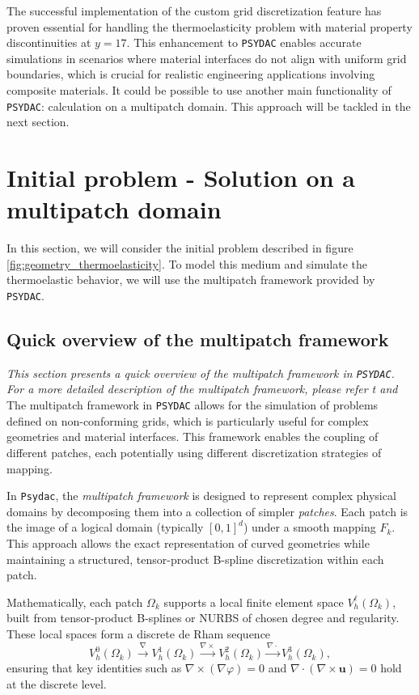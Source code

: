 \documentclass[a4paper,12pt,twoside]{report}
\begin{document}
The successful implementation of the custom grid discretization feature has proven essential for handling the thermoelasticity problem with material property discontinuities at $y = 17$. This enhancement to \texttt{PSYDAC} enables accurate simulations in scenarios where material interfaces do not align with uniform grid boundaries, which is crucial for realistic engineering applications involving composite materials. It could be possible to use another main functionality of \texttt{PSYDAC}: calculation on a multipatch domain. This approach will be tackled in the next section. 

\section{Initial problem - Solution on a multipatch domain}

In this section, we will consider the initial problem described in figure \ref{fig:geometry_thermoelasticity}. To model this medium and simulate the thermoelastic behavior, we will use the multipatch framework provided by \texttt{PSYDAC}.

\subsection{Quick overview of the multipatch framework}
\textit{This section presents a quick overview of the multipatch framework in \texttt{PSYDAC}. For a more detailed description of the multipatch framework, please refer t \cite{guclu_psydac_2022} and \cite{Guclu2023}} \\

The multipatch framework in \texttt{PSYDAC} allows for the simulation of problems defined on non-conforming grids, which is particularly useful for complex geometries and material interfaces. This framework enables the coupling of different patches, each potentially using different discretization strategies of mapping.

In \texttt{Psydac}, the \emph{multipatch framework} is designed to represent complex physical domains by decomposing them into a collection of simpler \emph{patches}. Each patch is the image of a logical domain (typically $[0,1]^d$) under a smooth mapping $F_k$. This approach allows the exact representation of curved geometries while maintaining a structured, tensor-product B-spline discretization within each patch.

Mathematically, each patch $\Omega_k$ supports a local finite element space $V_h^\ell(\Omega_k)$, built from tensor-product B-splines or NURBS of chosen degree and regularity. These local spaces form a discrete de Rham sequence
\[
V_h^0(\Omega_k) \xrightarrow{\nabla} V_h^1(\Omega_k) \xrightarrow{\nabla \times} V_h^2(\Omega_k) \xrightarrow{\nabla \cdot} V_h^3(\Omega_k),
\]
ensuring that key identities such as $\nabla \times (\nabla \varphi) = 0$ and $\nabla \cdot (\nabla \times \mathbf{u}) = 0$ hold at the discrete level.
\end{document}
